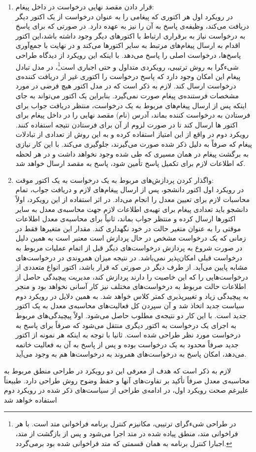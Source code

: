 \begin{enumerate}
\item قرار دادن مقصد نهایی درخواست در داخل پیغام:\\
در رویکرد اول هر اکتوری که پیغامی را به عنوان درخواست از یک اکتور دیگر دریافت می‌کند، وظیفه‌ی پاسخ به آن را نیز به عهده دارد. در صورتی که برای پاسخ به درخواست نیاز به برقراری ارتباط با اکتورهای دیگر وجود داشته باشد،‌این اکتور اقدام به ارسال پیغام‌های مرتبط به سایر اکتورها می‌کند و در نهایت با جمع‌آوری پاسخ‌ها، درخواست اصلی را پاسخ می‌دهد. با اینکه این رویکرد از دیدگاه طراحی شیءگرا به روش ترتیبی،‌ رویکردی متداول و حتی اجباری است\footnote{در طراحی شیءگرای ترتیبی، مکانیزم کنترل برنامه فراخوانی متد است. با هر فراخوانی متد، منطق پیاده شده در متد اجرا می‌شود و پس از بازگشت از متد، اجبارا کنترل برنامه به همان قسمتی که متد فراخوانی شده بود برمی‌گردد.}، در مدل تبادل پیغام این امکان وجود دارد که پاسخ درخواست را اکتوری غیر از دریافت کننده‌ی درخواست ارسال کند. لازم به ذکر است که در مدل اکتور هیچ فرضی در مورد مشخصات فرستنده‌ی پیغام صورت نمی‌گیرد. بنابراین یک اکتور می‌تواند به جای اینکه پس از ارسال پیغام‌های مربوط به یک درخواست، منتظر دریافت جواب برای فرستادن به درخواست کننده بماند،‌ آدرس (نام) مقصد نهایی را در داخل پیغام برای اکتور ها ارسال کند تا در صورت لزوم از آن برای فرستادن نتیجه استفاده کنند. رویکرد دوم در واقع از این امتیاز استفاده کرده و به این روش از تعدادی از تبادلات پیغام که صرفاً به دلیل ذکر شده صورت می‌گیرند، جلوگیری می‌کند. با این کار نیازی به برگشت پیغام در همان مسیری که طی شده وجود نخواهد داشت و در هر لحظه که اطلاعات لازم برای تکمیل پاسخ تأمین شود، پاسخ به مقصد ارسال خواهد شد.
\item واگذار کردن پردازش‌های مربوط به یک درخواست به یک اکتور موقت:\\
 در رویکرد اول اکتور دانشجو، پس از ارسال پیغام‌های لازم و دریافت جواب، تمام محاسبات لازم برای تعیین معدل را انجام ‌می‌داد. در اثر استفاده از این رویکرد، اولاً دانشجو باید تعدادی پیغام برای تهیه‌ی اطلاعات لازم جهت محاسبه‌ی معدل به سایر اکتورها ارسال کرده و منتظر جواب بماند، ثانیاً برای محاسبه‌ی معدل اطلاعات موقتی را به عنوان متغیر حالت در خود نگهداری کند. مقدار این متغیر‌ها فقط در زمانی که یک درخواست مشخص در حال پردازش است معتبر است به همین دلیل در صورت شروع به پردازش درخواست‌های دیگر قبل از اتمام عملیات مربوط به درخواست قبلی امکان‌پذیر نمی‌باشد. در نتیجه میزان همروندی در درخواست‌های مشابه پایین می‌آید. از طرف دیگر در صورتی که قرار باشد، اکتور انواع متعددی از درخواست‌هایی را که این خاصیت را دارند پردازش کند، مدیریت پیچیدگی حاصل از اطلاعات حالت مربوط به درخواست‌های مختلف نیز کار آسانی نخواهد بود و منجر به پیچیدگی زیاد  و تغییرپذیری کمتر کلاس خواهد شد. به همین دلایل در رویکرد دوم سیاست جدید اتخاذ شد و آن سپردن کل فعالیت‌های محاسبه‌ی معدل به یک اکتور جدید است. با این کار دو نتیجه‌ی مطلوب حاصل می‌شود. اولاً پیچیدگی‌های مربوط به اجرای یک درخواست به اکتور دیگری منتقل می‌شود که صرفاً برای پاسخ به درخواست مورد نظر طراحی شده است. ثانیا با توجه به اینکه هر نمونه از اکتور جدید صرفاً محدود به یک درخواست بوده و پس از پاسخ به‌ آن به فعالیت خاتمه می‌دهد، امکان پاسخ به درخواست‌های همروند به درخواست‌ها هم به وجود می‌آید.
\end{enumerate}
لازم به ذکر است که هدف از معرفی این دو رویکرد در طراحی منطق مربوط به محاسبه‌ی معدل صرفاً تأکید بر تفاوت‌های آنها و حفظ وضوح روش طراحی دارد. طبیعتاً علیرغم صحت رویکرد اول، در ادامه‌ی طراحی از سیاست‌های ذکر شده در رویکرد دوم استفاده خواهد شد
